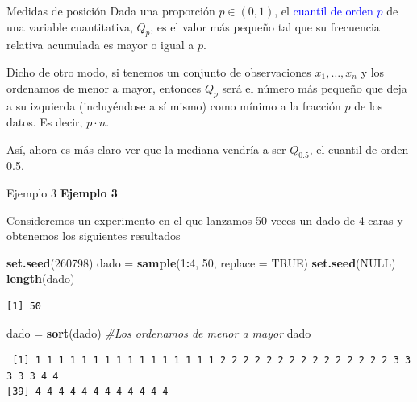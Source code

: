 \documentclass[
  ignorenonframetext,
]{beamer}
\newenvironment{Shaded}{\begin{snugshade}}{\end{snugshade}}
\newcommand{\AttributeTok}[1]{\textcolor[rgb]{0.13,0.29,0.53}{#1}}
\newcommand{\CommentTok}[1]{\textcolor[rgb]{0.56,0.35,0.01}{\textit{#1}}}
\newcommand{\ConstantTok}[1]{\textcolor[rgb]{0.56,0.35,0.01}{#1}}
\newcommand{\DecValTok}[1]{\textcolor[rgb]{0.00,0.00,0.81}{#1}}
\newcommand{\FunctionTok}[1]{\textcolor[rgb]{0.13,0.29,0.53}{\textbf{#1}}}
\newcommand{\NormalTok}[1]{#1}
\newcommand{\OtherTok}[1]{\textcolor[rgb]{0.56,0.35,0.01}{#1}}
\newcommand{\SpecialCharTok}[1]{\textcolor[rgb]{0.81,0.36,0.00}{\textbf{#1}}}
\newcommand\blue[1]{\textcolor{blue}{#1}}
\begin{document}
\begin{frame}{Medidas de posición}
\label{medidas-de-posiciuxf3n-2}
Dada una proporción \(p\in(0,1)\), el \blue{cuantil de orden $p$} de una
variable cuantitativa, \(Q_p\), es el valor más pequeño tal que su
frecuencia relativa acumulada es mayor o igual a \(p\).

Dicho de otro modo, si tenemos un conjunto de observaciones
\(x_1,\dots,x_n\) y los ordenamos de menor a mayor, entonces \(Q_p\)
será el número más pequeño que deja a su izquierda (incluyéndose a sí
mismo) como mínimo a la fracción \(p\) de los datos. Es decir,
\(p\cdot n\).

Así, ahora es más claro ver que la mediana vendría a ser \(Q_{0.5}\), el
cuantil de orden 0.5.
\end{frame}

\begin{frame}[fragile]{Ejemplo 3}
\label{ejemplo-3-10}
\textbf{Ejemplo 3}

Consideremos un experimento en el que lanzamos 50 veces un dado de 4
caras y obtenemos los siguientes resultados

\begin{Shaded}
\begin{Highlighting}[]
\FunctionTok{set.seed}\NormalTok{(}\DecValTok{260798}\NormalTok{)}
\NormalTok{dado }\OtherTok{=} \FunctionTok{sample}\NormalTok{(}\DecValTok{1}\SpecialCharTok{:}\DecValTok{4}\NormalTok{, }\DecValTok{50}\NormalTok{, }\AttributeTok{replace =} \ConstantTok{TRUE}\NormalTok{)}
\FunctionTok{set.seed}\NormalTok{(}\ConstantTok{NULL}\NormalTok{)}
\FunctionTok{length}\NormalTok{(dado)}
\end{Highlighting}
\end{Shaded}

\begin{verbatim}
[1] 50
\end{verbatim}

\begin{Shaded}
\begin{Highlighting}[]
\NormalTok{dado }\OtherTok{=} \FunctionTok{sort}\NormalTok{(dado) }\CommentTok{\#Los ordenamos de menor a mayor}
\NormalTok{dado}
\end{Highlighting}
\end{Shaded}

\begin{verbatim}
 [1] 1 1 1 1 1 1 1 1 1 1 1 1 1 1 1 1 2 2 2 2 2 2 2 2 2 2 2 2 2 2 2 3 3 3 3 3 4 4
[39] 4 4 4 4 4 4 4 4 4 4 4 4
\end{verbatim}
\end{frame}
\end{document}
